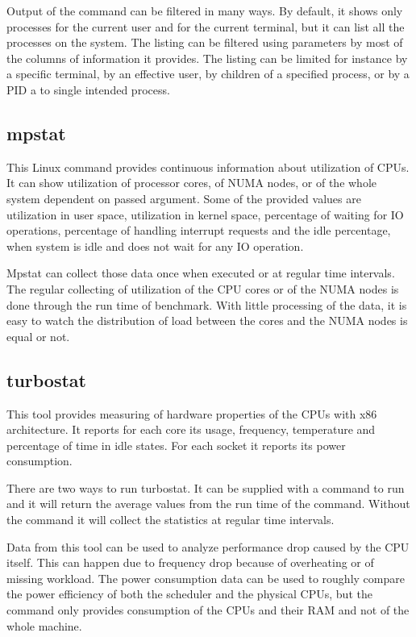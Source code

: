 Output of the command can be filtered in many ways. By default, it shows only
processes for the current user and for the current terminal, but it can list all
the processes on the system. The listing can be filtered using parameters by
most of the columns of information it provides. The listing can be limited for
instance by a specific terminal, by an effective user, by children of a specified process,
or by a PID a to single intended process.

\subsection{mpstat}
This Linux command provides continuous information about utilization of CPUs. It
can show utilization of processor cores, of NUMA nodes, or of the whole system
dependent on passed argument. Some of the provided values are utilization in
user space, utilization in kernel space, percentage of waiting for IO
operations, percentage of handling interrupt requests and the idle percentage,
when system is idle and does not wait for any IO operation.

Mpstat can collect those data once when executed or at regular time intervals.
The regular collecting of utilization of the CPU cores or of the NUMA nodes is
done through the run time of benchmark. With little processing of the data, it
is easy to watch the distribution of load between the cores and the NUMA nodes
is equal or not.

\subsection{turbostat}
This tool provides measuring of hardware properties of the CPUs with x86
architecture. It reports for each core its usage, frequency, temperature and
percentage of time in idle states. For each socket it reports its power consumption.

There are two ways to run turbostat. It can be supplied with a command to run
and it will return the average values from the run time of the command. Without
the command it will collect the statistics at regular time intervals.

Data from this tool can be used to analyze performance drop caused by the CPU
itself. This can happen due to frequency drop because of overheating or of
missing workload. The power consumption data can be used to roughly compare the
power efficiency of both the scheduler and the physical CPUs, but the command
only provides consumption of the CPUs and their RAM and not of the whole
machine.

